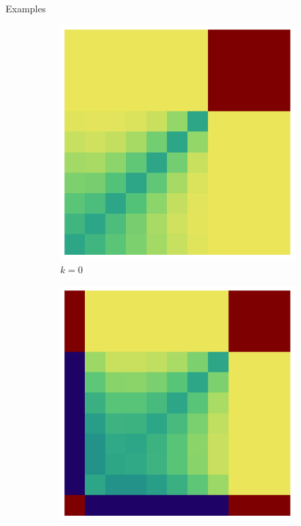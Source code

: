 \documentclass{beamer}
\theoremstyle{definition}
\begin{document}
\begin{frame}[shrink=10]{Examples}
    \begin{figure}[H]
    \centering
    \begin{subfigure}[b]{0.185\textwidth}
        \includegraphics[width=\textwidth]{img/ppkB_Plot_4_0_10.pdf}
        \caption{$k=0$}
        \label{fig:ppkBG_4_0}
    \end{subfigure}
    \hspace{0.00\textwidth} %
    \begin{subfigure}[b]{0.185\textwidth}
        \includegraphics[width=\textwidth]{img/ppkB_Plot_4_1_10.pdf}

\end{subfigure}
\end{figure}
\end{frame}
\end{document}
